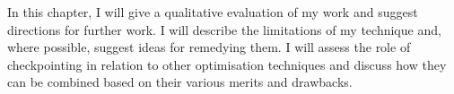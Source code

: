In this chapter, I will give a qualitative evaluation of my work and suggest directions for further work.
I will describe the limitations of my technique and, where possible, suggest ideas for remedying them.
I will assess the role of checkpointing in relation to other optimisation techniques and discuss how they can be combined based on their various merits and drawbacks.

